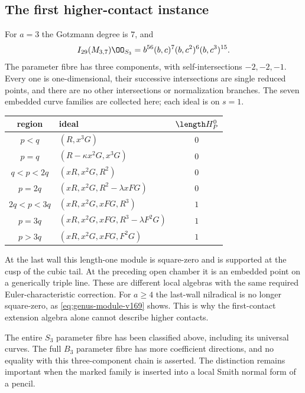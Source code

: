 \subsection{The first higher-contact instance}
For $a=3$ the Gotzmann degree is $7$, and
\begin{equation}\label{eq:cubic-factor-v169}
 I_{29}(M_{3,7})\OO_{S_3}
       =b^{56}(b,c)^7(b,c^2)^6(b,c^3)^{15}.
\end{equation}
The parameter fibre has three components, with self-intersections
$-2,-2,-1$. Every one is one-dimensional, their successive
intersections are single reduced points, and there are no other
intersections or normalization branches. The seven embedded curve
families are collected here; each ideal is on $s=1$.
\begin{center}
\small
\begin{tabular}{c|l|c}
region & ideal & $\length H^0_P$\\ \hline
$p<q$ & $(R,x^3G)$ & $0$\\
$p=q$ & $(R-\kappa x^2G,x^3G)$ & $0$\\
$q<p<2q$ & $(xR,x^2G,R^2)$ & $0$\\
$p=2q$ & $(xR,x^2G,R^2-\lambda xFG)$ & $0$\\
$2q<p<3q$ & $(xR,x^2G,xFG,R^3)$ & $1$\\
$p=3q$ & $(xR,x^2G,xFG,R^3-\lambda F^2G)$ & $1$\\
$p>3q$ & $(xR,x^2G,xFG,F^2G)$ & $1$
\end{tabular}
\end{center}
At the last wall this length-one module is square-zero and is supported
at the cusp of the cubic tail. At the preceding open chamber it is
an embedded point on a generically triple line. These are different
local algebras with the same required Euler-characteristic correction.
For $a\geq4$ the last-wall nilradical is no longer square-zero, as
\eqref{eq:genus-module-v169} shows. This is why the first-contact
extension algebra alone cannot describe higher contacts.

The entire $S_3$ parameter fibre has been classified above, including
its universal curves. The full $B_3$ parameter fibre has more
coefficient directions, and no equality with this three-component
chain is asserted. The distinction remains important when the
marked family is inserted into a local Smith normal form of a pencil.
